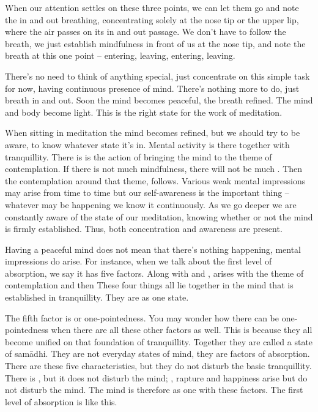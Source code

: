 When our attention settles on these three points, we can let them go and note the in and out breathing, concentrating solely at the nose tip or the upper lip, where the air passes on its in and out passage. We don't have to follow the breath, we just establish mindfulness in front of us at the nose tip, and note the breath at this one point -- entering, leaving, entering, leaving. 

There's no need to think of anything special, just concentrate on this simple task for now, having continuous presence of mind. There's nothing more to do, just breath in and out. Soon the mind becomes peaceful, the breath refined. The mind and body become light. This is the right state for the work of meditation. 

When sitting in meditation the mind becomes refined, but we should try to be aware, to know whatever state it's in. Mental activity is there together with tranquillity. There is   is the action of bringing the mind to the theme of contemplation. If there is not much mindfulness, there will not be much . Then  the contemplation around that theme, follows. Various weak mental impressions may arise from time to time but our self-awareness is the important thing -- whatever may be happening we know it continuously. As we go deeper we are constantly aware of the state of our meditation, knowing whether or not the mind is firmly established. Thus, both concentration and awareness are present. 

Having a peaceful mind does not mean that there's nothing happening, mental impressions do arise. For instance, when we talk about the first level of absorption, we say it has five factors. Along with  and ,   arises with the theme of contemplation and then  These four things all lie together in the mind that is established in tranquillity. They are as one state. 

The fifth factor is  or one-pointedness. You may wonder how there can be one-pointedness when there are all these other factors as well. This is because they all become unified on that foundation of tranquillity. Together they are called a state of sam\=adhi. They are not everyday states of mind, they are factors of absorption. There are these five characteristics, but they do not disturb the basic tranquillity. There is , but it does not disturb the mind; , rapture and happiness arise but do not disturb the mind. The mind is therefore as one with these factors. The first level of absorption is like this. 

